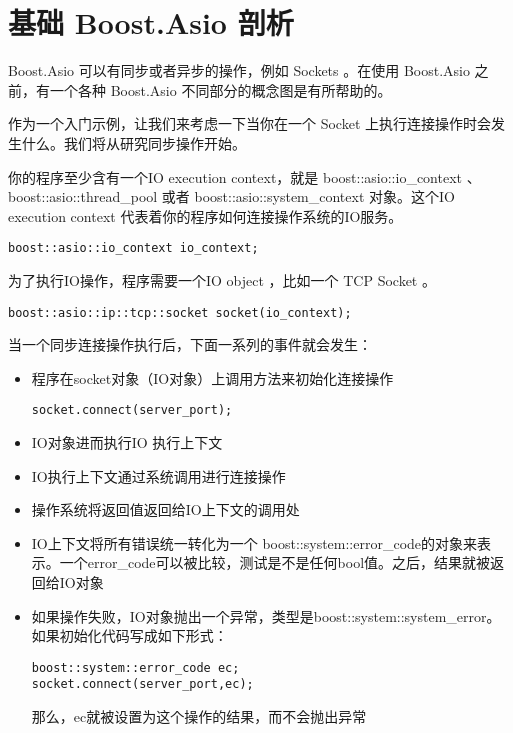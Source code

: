 \section{基础 Boost.Asio 剖析}
Boost.Asio 可以有同步或者异步的操作，例如 Sockets 。在使用 Boost.Asio 之前，有一个各种 Boost.Asio 不同部分的概念图是有所帮助的。

作为一个入门示例，让我们来考虑一下当你在一个 Socket 上执行连接操作时会发生什么。我们将从研究同步操作开始。

你的程序至少含有一个IO execution context，就是 boost::asio::io\_context 、 boost::asio::thread\_pool 或者 boost::asio::system\_context 对象。这个IO execution context 代表着你的程序如何连接操作系统的IO服务。


\begin{lstlisting}[frame=shadowbox]
boost::asio::io_context io_context;
\end{lstlisting}

为了执行IO操作，程序需要一个IO object ，比如一个 TCP Socket 。

\begin{lstlisting}[frame=shadowbox]
boost::asio::ip::tcp::socket socket(io_context);
\end{lstlisting}

当一个同步连接操作执行后，下面一系列的事件就会发生：

\begin{itemize}
	\item 程序在socket对象（IO对象）上调用方法来初始化连接操作
	\begin{lstlisting}[frame=shadowbox]
socket.connect(server_port);
	\end{lstlisting}
	\item IO对象进而执行IO 执行上下文
	\item IO执行上下文通过系统调用进行连接操作
	\item 操作系统将返回值返回给IO上下文的调用处
	\item IO上下文将所有错误统一转化为一个 boost::system::error\_code的对象来表示。一个error\_code可以被比较，测试是不是任何bool值。之后，结果就被返回给IO对象
	\item 如果操作失败，IO对象抛出一个异常，类型是boost::system::system\_error。如果初始化代码写成如下形式：
	\begin{lstlisting}[frame=shadowbox]
boost::system::error_code ec;	
socket.connect(server_port,ec);
	\end{lstlisting}
	那么，ec就被设置为这个操作的结果，而不会抛出异常
\end{itemize}

